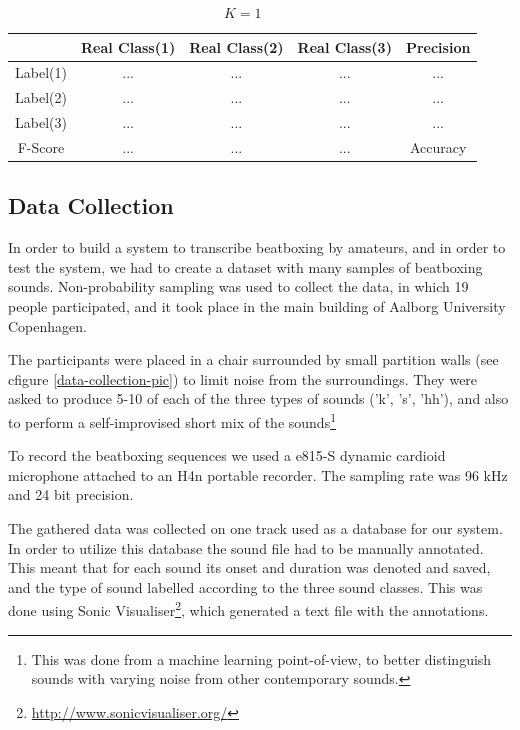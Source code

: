 			\begin{table}
				\centering
				\begin{tabular}{|c | c | c | c | c |}
					\hline
				 & Real Class(1) & Real Class(2) & Real Class(3) & Precision\\ \hline
					Label(1)  & ... & ... & ... & ...\\ \hline
					Label(2)  & ... & ... & ... & ...\\ \hline
					Label(3) & ... & ... & ... & ...\\ \hline
					F-Score & ... & ... & ... & Accuracy \\ \cline{1-4}
				\end{tabular}
				\caption{$K=1$}
				\label{table:eval:explanatory}
			\end{table}
		
		
	\subsection{Data Collection}
	\label{sec:data-collecting}
	In order to build a system to transcribe beatboxing by amateurs, and in order to test the system, we had to create a dataset with many samples of beatboxing sounds. 
	Non-probability sampling was used to collect the data, in which 19 people participated, and it took place in the main building of Aalborg University Copenhagen. 
	
	The participants were placed in a chair surrounded by small partition walls (see cfigure \ref{data-collection-pic}) to limit noise from the surroundings. They were asked to produce 5-10 of each of the three types of sounds ('k', 's', 'hh'), and also to perform a self-improvised short mix of the sounds\footnote{This was done from a machine learning point-of-view, to better distinguish sounds with varying noise from other contemporary sounds.}
	
	To record the beatboxing sequences we used a e815-S dynamic cardioid microphone attached to an H4n portable recorder. The sampling rate was 96 kHz and 24 bit precision.
	
	The gathered data was collected on one track used as a database for our system. In order to utilize this database the sound file had to be manually annotated. This meant that for each sound its onset and duration was denoted and saved, and the type of sound labelled according to the three sound classes. This was done using Sonic Visualiser\footnote{\url{http://www.sonicvisualiser.org/}}, which generated a text file with the annotations.
	
